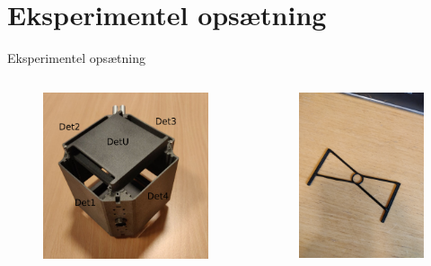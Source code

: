 \section{Eksperimentel opsætning}
\begin{frame}{Eksperimentel opsætning}
	\begin{columns}
		\begin{figure}
			\centering
			\includegraphics[width=\columnwidth]{../figures/cubepic.pdf}
		\end{figure}
		\begin{figure}
			\includegraphics[width=.9\columnwidth]{../figures/targetHolder.jpg}

\end{figure}
\end{columns}
\end{frame}
